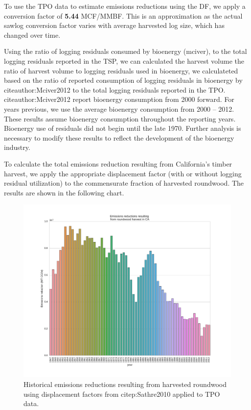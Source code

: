 \documentclass[a4paper]{article}
\begin{document}
To use the TPO data to estimate emissions reductions using the DF, we apply a
conversion factor of \textbf{5.44} MCF/MMBF. This is an approximation as the
actual sawlog conversion factor varies with average harvested log size, which has changed over time.  


Using the ratio of logging residuals consumed by bioenergy (mciver), to the total logging residuals reported in the TSP, we can calculated the harvest volume the ratio of harvest volume to logging residuals used in bioenergy,
we calculateted 
based on the ratio of reported consumption of logging residuals in
bioenergy by citeauthor:Mciver2012 to the total logging residuals reported
in the TPO. citeauthor:Mciver2012 report bioenergy consumption from 2000
forward. For years previous, we use the average bioenergy consumption
from 2000 -- 2012. These results assume bioenergy consumption
throughout the reporting years. Bioenergy use of residuals did not
begin until the late 1970. Further analysis is necessary to modify
these results to reflect the development of the bioenergy industry.

To calculate the total emissions reduction resulting from California's
timber harvest, we apply the appropriate displacement factor (with or
without logging residual utilization) to the commensurate fraction of
harvested roundwood. The results are shown in the following chart.

\begin{figure}[htb]
\centering
\includegraphics[width=\textwidth]{./graphics/ann_hh_em_reduc.pdf}
\caption{Historical emissions reductions resulting from harvested roundwood using displacement factors from citep:Sathre2010 applied to TPO data.}
\end{figure}
\end{document}
